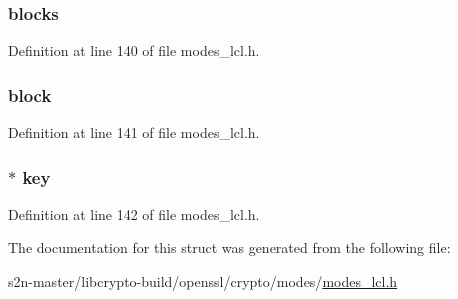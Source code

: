 \subsubsection[{\texorpdfstring{blocks}{blocks}}]{ blocks}\hypertarget{structccm128__context_aeb0f59bd48db07d678f25b6fc87dd3db}{}\label{structccm128__context_aeb0f59bd48db07d678f25b6fc87dd3db}


Definition at line 140 of file modes\+\_\+lcl.\+h.

\subsubsection[{\texorpdfstring{block}{block}}]{ block}\hypertarget{structccm128__context_a59f10af1cb28ada84b1535c0270f51e4}{}\label{structccm128__context_a59f10af1cb28ada84b1535c0270f51e4}


Definition at line 141 of file modes\+\_\+lcl.\+h.

\subsubsection[{\texorpdfstring{key}{key}}]{$\ast$ key}\hypertarget{structccm128__context_ab5c000aec752f2206131e183daf5efbf}{}\label{structccm128__context_ab5c000aec752f2206131e183daf5efbf}


Definition at line 142 of file modes\+\_\+lcl.\+h.



The documentation for this struct was generated from the following file\+:\begin{DoxyCompactItemize}
\item 
s2n-\/master/libcrypto-\/build/openssl/crypto/modes/\hyperlink{modes__lcl_8h}{modes\+\_\+lcl.\+h}\end{DoxyCompactItemize}
